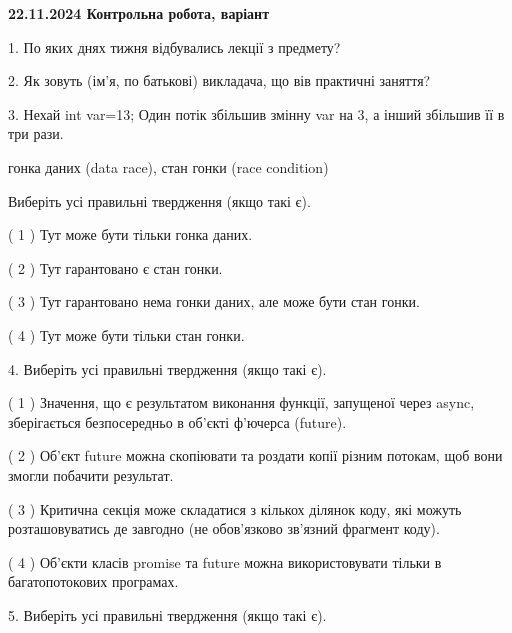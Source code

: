 \documentclass[12pt, ukrainian]{article}
\begin{document}
\vspace{4mm}
\newpage
\begin {large}

\textbf{22.11.2024 Контрольна робота, варіант  }\par


{
1. По яких днях тижня відбувались лекції з предмету?



\vspace{5mm}
2. Як зовуть (ім'я, по батькові) викладача, що вів практичні заняття?



\vspace{5mm}
3. Нехай int var=13; Один потік збільшив змінну var на 3, а інший збільшив її в три рази.

гонка даних (data race), стан гонки (race condition)

Виберіть усі правильні твердження (якщо такі є).\par
\vspace{2mm}
( 1 ) Тут може бути тільки гонка даних.%

( 2 ) Тут гарантовано є стан гонки.%

( 3 ) Тут гарантовано нема гонки даних, але може бути стан гонки.%

( 4 ) Тут може бути тільки стан гонки.%


\vspace{5mm}
4. Виберіть усі правильні твердження (якщо такі є).\par
\vspace{2mm}

( 1 ) Значення, що є результатом виконання функції, запущеної через async, зберігається безпосередньо в об’єкті ф’ючерса (future).%

( 2 ) Об’єкт future можна скопіювати та роздати копії різним потокам, щоб вони змогли побачити результат.%

( 3 ) Критична секція може складатися з кількох ділянок коду, які можуть розташовуватись де завгодно (не обов’язково зв’язний фрагмент коду).%

( 4 ) Об’єкти класів promise та future можна використовувати тільки в багатопотокових програмах.%


\vspace{5mm}
5. Виберіть усі правильні твердження (якщо такі є).\par
\vspace{2mm}

}
\end{large}
\end{document}
